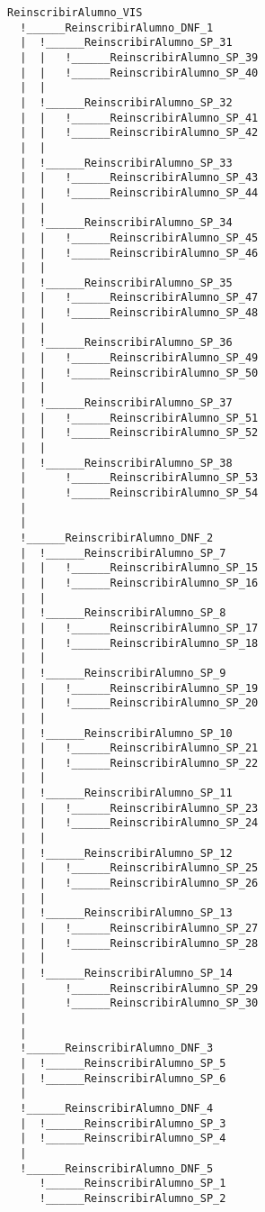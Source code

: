 \documentclass{article}
\begin{document}
\begin{verbatim}
ReinscribirAlumno_VIS
  !______ReinscribirAlumno_DNF_1
  |	 !______ReinscribirAlumno_SP_31
  |	 |	 !______ReinscribirAlumno_SP_39
  |	 |	 !______ReinscribirAlumno_SP_40
  |	 |
  |	 !______ReinscribirAlumno_SP_32
  |	 |	 !______ReinscribirAlumno_SP_41
  |	 |	 !______ReinscribirAlumno_SP_42
  |	 |
  |	 !______ReinscribirAlumno_SP_33
  |	 |	 !______ReinscribirAlumno_SP_43
  |	 |	 !______ReinscribirAlumno_SP_44
  |	 |
  |	 !______ReinscribirAlumno_SP_34
  |	 |	 !______ReinscribirAlumno_SP_45
  |	 |	 !______ReinscribirAlumno_SP_46
  |	 |
  |	 !______ReinscribirAlumno_SP_35
  |	 |	 !______ReinscribirAlumno_SP_47
  |	 |	 !______ReinscribirAlumno_SP_48
  |	 |
  |	 !______ReinscribirAlumno_SP_36
  |	 |	 !______ReinscribirAlumno_SP_49
  |	 |	 !______ReinscribirAlumno_SP_50
  |	 |
  |	 !______ReinscribirAlumno_SP_37
  |	 |	 !______ReinscribirAlumno_SP_51
  |	 |	 !______ReinscribirAlumno_SP_52
  |	 |
  |	 !______ReinscribirAlumno_SP_38
  |	 	 !______ReinscribirAlumno_SP_53
  |	 	 !______ReinscribirAlumno_SP_54
  |	
  |
  !______ReinscribirAlumno_DNF_2
  |	 !______ReinscribirAlumno_SP_7
  |	 |	 !______ReinscribirAlumno_SP_15
  |	 |	 !______ReinscribirAlumno_SP_16
  |	 |
  |	 !______ReinscribirAlumno_SP_8
  |	 |	 !______ReinscribirAlumno_SP_17
  |	 |	 !______ReinscribirAlumno_SP_18
  |	 |
  |	 !______ReinscribirAlumno_SP_9
  |	 |	 !______ReinscribirAlumno_SP_19
  |	 |	 !______ReinscribirAlumno_SP_20
  |	 |
  |	 !______ReinscribirAlumno_SP_10
  |	 |	 !______ReinscribirAlumno_SP_21
  |	 |	 !______ReinscribirAlumno_SP_22
  |	 |
  |	 !______ReinscribirAlumno_SP_11
  |	 |	 !______ReinscribirAlumno_SP_23
  |	 |	 !______ReinscribirAlumno_SP_24
  |	 |
  |	 !______ReinscribirAlumno_SP_12
  |	 |	 !______ReinscribirAlumno_SP_25
  |	 |	 !______ReinscribirAlumno_SP_26
  |	 |
  |	 !______ReinscribirAlumno_SP_13
  |	 |	 !______ReinscribirAlumno_SP_27
  |	 |	 !______ReinscribirAlumno_SP_28
  |	 |
  |	 !______ReinscribirAlumno_SP_14
  |	 	 !______ReinscribirAlumno_SP_29
  |	 	 !______ReinscribirAlumno_SP_30
  |	
  |
  !______ReinscribirAlumno_DNF_3
  |	 !______ReinscribirAlumno_SP_5
  |	 !______ReinscribirAlumno_SP_6
  |
  !______ReinscribirAlumno_DNF_4
  |	 !______ReinscribirAlumno_SP_3
  |	 !______ReinscribirAlumno_SP_4
  |
  !______ReinscribirAlumno_DNF_5
  	 !______ReinscribirAlumno_SP_1
  	 !______ReinscribirAlumno_SP_2
\end{verbatim}
\end{document}
